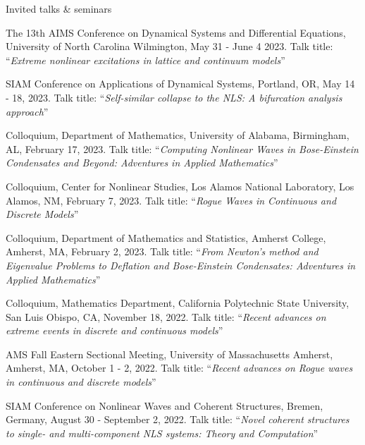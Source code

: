 \documentclass[10pt]{article} %
\begin{document}
\begin{section}{Invited talks \& seminars}
\begin{etaremune}
\item The 13th AIMS Conference on Dynamical Systems and Differential Equations, University of North Carolina Wilmington, %
May 31 - June 4 2023. Talk title: ``\textit{Extreme nonlinear excitations in lattice and continuum models}''

\item SIAM Conference on Applications of Dynamical Systems, Portland, OR, May 14 - 18, 2023. 
Talk title: ``\textit{Self-similar collapse to the NLS: A bifurcation analysis approach}''

\item Colloquium, Department of Mathematics, University of Alabama, Birmingham, AL, February 17, 2023. 
Talk title: ``\textit{Computing Nonlinear Waves in Bose-Einstein Condensates and Beyond: Adventures in 
Applied Mathematics}''

\item Colloquium, Center for Nonlinear Studies, Los Alamos National Laboratory, Los Alamos, NM, February 7, 2023. 
      Talk title: ``\textit{Rogue Waves in Continuous and Discrete Models}''

\item Colloquium, Department of Mathematics and Statistics, Amherst College, Amherst, MA, February 2, 2023. 
Talk title: ``\textit{From Newton's method and Eigenvalue Problems to Deflation and Bose-Einstein 
Condensates: Adventures in Applied Mathematics}''

\item Colloquium, Mathematics Department, California Polytechnic State University, San Luis Obispo, CA, November 18, 2022. 
Talk title: ``\textit{Recent advances on extreme events in discrete and continuous models}''

\item AMS Fall Eastern Sectional Meeting, University of Massachusetts Amherst, Amherst, MA, October 1 - 2, 2022.
Talk title: ``\textit{Recent advances on Rogue waves in continuous and discrete models}''

\item SIAM Conference on Nonlinear Waves and Coherent Structures, Bremen, Germany, August 30 - September 2, 2022.
Talk title: ``\textit{Novel coherent structures to single- and multi-component NLS systems: Theory and Computation}''


\end{etaremune}
\end{section}
\end{document}
